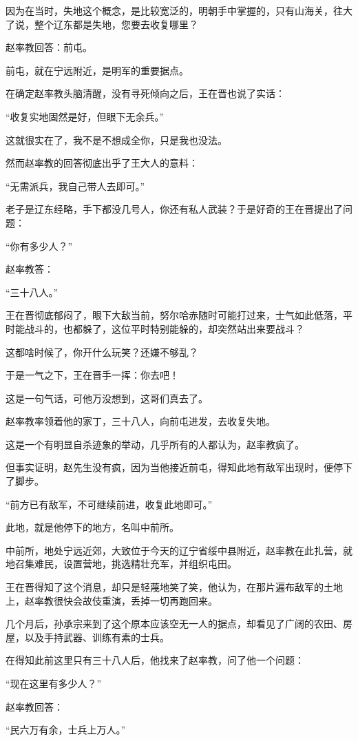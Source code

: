\begin{multicols}{\theparacolNo}
因为在当时，失地这个概念，是比较宽泛的，明朝手中掌握的，只有山海关，往大了说，整个辽东都是失地，您要去收复哪里？

赵率教回答：前屯。

前屯，就在宁远附近，是明军的重要据点。

在确定赵率教头脑清醒，没有寻死倾向之后，王在晋也说了实话：

“收复实地固然是好，但眼下无余兵。”

这就很实在了，我不是不想成全你，只是我也没法。

然而赵率教的回答彻底出乎了王大人的意料：

“无需派兵，我自己带人去即可。”

老子是辽东经略，手下都没几号人，你还有私人武装？于是好奇的王在晋提出了问题：

“你有多少人？”

赵率教答：

“三十八人。”

王在晋彻底郁闷了，眼下大敌当前，努尔哈赤随时可能打过来，士气如此低落，平时能战斗的，也都躲了，这位平时特别能躲的，却突然站出来要战斗？

这都啥时候了，你开什么玩笑？还嫌不够乱？

于是一气之下，王在晋手一挥：你去吧！

这是一句气话，可他万没想到，这哥们真去了。

赵率教率领着他的家丁，三十八人，向前屯进发，去收复失地。

这是一个有明显自杀迹象的举动，几乎所有的人都认为，赵率教疯了。

但事实证明，赵先生没有疯，因为当他接近前屯，得知此地有敌军出现时，便停下了脚步。

“前方已有敌军，不可继续前进，收复此地即可。”

此地，就是他停下的地方，名叫中前所。

中前所，地处宁远近郊，大致位于今天的辽宁省绥中县附近，赵率教在此扎营，就地召集难民，设置营地，挑选精壮充军，并组织屯田。

王在晋得知了这个消息，却只是轻蔑地笑了笑，他认为，在那片遍布敌军的土地上，赵率教很快会故伎重演，丢掉一切再跑回来。

几个月后，孙承宗来到了这个原本应该空无一人的据点，却看见了广阔的农田、房屋，以及手持武器、训练有素的士兵。

在得知此前这里只有三十八人后，他找来了赵率教，问了他一个问题：

“现在这里有多少人？”

赵率教回答：

“民六万有余，士兵上万人。”


\end{multicols}
